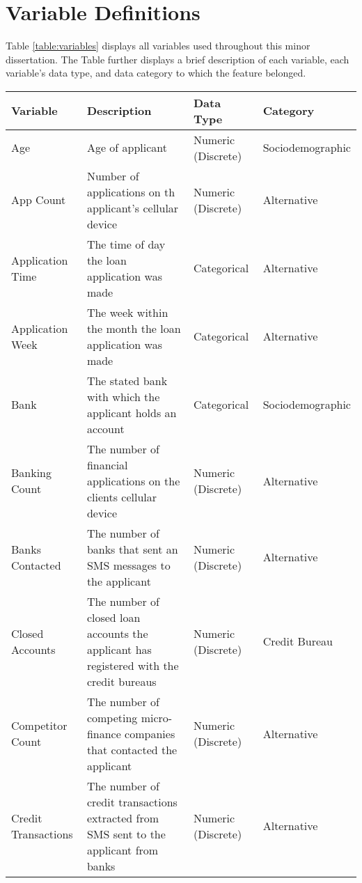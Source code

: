 \chapter{Variable Definitions} %

\label{AppendixA} %

Table \ref{table:variables} displays all variables used throughout this minor dissertation. The Table further displays a brief description of each variable, each variable's data type, and data category to which the feature belonged. 

\vspace{10pt}


\begin{longtable}{|p{2.5cm}|p{5.5cm}|p{2cm}|p{3.1cm}|}
\hline
\multicolumn{1}{|p{2.5cm}|}{Variable}&
\multicolumn{1}{|p{5.5cm}|}{Description}&
\multicolumn{1}{|p{2cm}|}{Data Type}&
\multicolumn{1}{|p{3.1cm}|}{Category}\\
\hline
Age & Age of applicant  & Numeric (Discrete) & Sociodemographic \\
\hline
App Count & Number of applications on th applicant's cellular device & Numeric (Discrete) & Alternative \\
\hline
Application Time & The time of day the loan application was made & Categorical & Alternative \\
\hline
Application Week & The week within the month the loan application was made  & Categorical & Alternative \\
\hline
Bank & The stated bank with which the applicant holds an account & Categorical & Sociodemographic \\
\hline
Banking Count & The number of financial applications on the clients cellular device & Numeric (Discrete)  & Alternative \\
\hline
Banks Contacted & The number of banks that sent an SMS messages to the applicant & Numeric (Discrete) & Alternative \\
\hline
Closed Accounts & The number of closed loan accounts the applicant has registered with the credit bureaus & Numeric (Discrete) & Credit Bureau \\
\hline
Competitor Count & The number of competing micro-finance companies that contacted the applicant & Numeric (Discrete) & Alternative \\
\hline 
Credit Transactions & The number of credit transactions extracted from SMS sent to the applicant from banks & Numeric (Discrete) & Alternative \\

\end{longtable}
